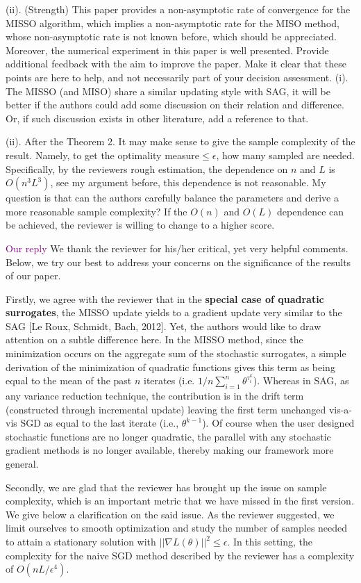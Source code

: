 \documentclass{article} %
\theoremstyle{t}
\begin{document}
(ii). (Strength) This paper provides a non-asymptotic rate of convergence for the MISSO algorithm, which implies a non-asymptotic rate for the MISO method, whose non-asymptotic rate is not known before, which should be appreciated. Moreover, the numerical experiment in this paper is well presented.
Provide additional feedback with the aim to improve the paper. Make it clear that these points are here to help, and not necessarily part of your decision assessment.
(i). The MISSO (and MISO) share a similar updating style with SAG, it will be better if the authors could add some discussion on their relation and difference. Or, if such discussion exists in other literature, add a reference to that.


(ii). After the Theorem 2. It may make sense to give the sample complexity of the result. Namely, to get the optimality measure$ \leq \epsilon$, how many sampled are needed. Specifically, by the reviewers rough estimation, the dependence on $n$ and $L $ is $O(n^3L^3)$, see my argument before, this dependence is not reasonable. My question is that can the authors carefully balance the parameters and derive a more reasonable sample complexity? If the $O(n)$ and $O(L)$ dependence can be achieved, the reviewer is willing to change to a higher score.


\textcolor{purple}{Our reply}
We thank the reviewer for his/her critical, yet very helpful comments. Below, we try our best to address your concerns on the significance of the results of our paper.   

Firstly, we agree with the reviewer that in the \textbf{special case of quadratic surrogates}, the MISSO update yields to a gradient update very similar to the SAG [Le Roux, Schmidt, Bach, 2012]. Yet, the authors would like to draw attention on a subtle difference here. In the MISSO method, since the minimization occurs on the aggregate sum of the stochastic surrogates, a simple derivation of the minimization of quadratic functions gives this term as being equal to the mean of the past $n$ iterates (i.e. $1/n \sum_{i=1}^n \theta^{\tau_i^k}$). Whereas in SAG, as any variance reduction technique, the contribution is in the drift term (constructed through incremental update) leaving the first term unchanged vis-a-vis SGD as equal to the last iterate (i.e., $\theta^{k-1}$).
Of course when the user designed stochastic functions are no longer quadratic, the parallel with any stochastic gradient methods is no longer available, thereby making our framework more general.

Secondly, we are glad that the reviewer has brought up the issue on sample complexity, which is an important metric that we have missed in the first version. We give below a clarification on the said issue. As the reviewer suggested, we limit ourselves to smooth optimization and study the number of samples needed to attain a stationary solution with $|| \nabla L( \theta) ||^2 \leq \epsilon$. In this setting, the complexity for the naive SGD method described by the reviewer has a complexity of $O( nL / \epsilon^4)$. 
\end{document}
